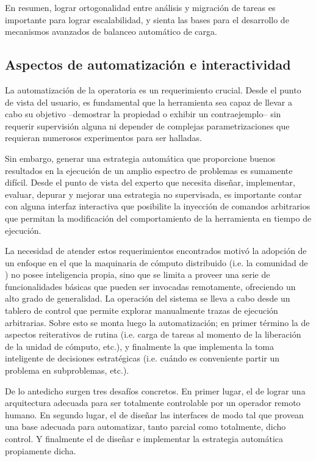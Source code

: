 En resumen, lograr ortogonalidad entre análisis y migración de tareas es
importante para lograr escalabilidad, y sienta las bases para el desarrollo de mecanismos
avanzados de balanceo automático de carga.



\subsection{Aspectos de automatización e interactividad}

La automatización de la operatoria es un requerimiento crucial. Desde el punto
de vista del usuario, es fundamental que la herramienta sea capaz de llevar a
cabo su objetivo --demostrar la propiedad o exhibir un contraejemplo-- sin requerir
supervisión alguna ni depender de complejas parametrizaciones que requieran
numerosos experimentos para ser halladas.

Sin embargo, generar una estrategia automática que proporcione buenos resultados
en la ejecución de un amplio espectro de problemas es sumamente difícil. Desde el
punto de vista del experto que necesita diseñar, implementar, evaluar, depurar y
mejorar una estrategia no supervisada, es importante contar con alguna
interfaz interactiva que posibilite la inyección de comandos arbitrarios que permitan 
la modificación del comportamiento de la herramienta en tiempo de ejecución.

La necesidad de atender estos requerimientos encontrados motivó la adopción de
un enfoque en el que la maquinaria de cómputo distribuido (i.e. la comunidad de \ws) no posee inteligencia
propia, sino que se limita a proveer una serie de funcionalidades básicas que
pueden ser invocadas remotamente, ofreciendo un alto grado de generalidad. La
operación del sistema se lleva a cabo desde un tablero de control que permite
explorar manualmente trazas de ejecución arbitrarias. Sobre esto se monta
luego la automatización; en primer término la de aspectos reiterativos de rutina (i.e. carga de tareas al momento de la liberación de la unidad de cómputo, etc.),
y finalmente la que implementa la toma inteligente de decisiones estratégicas (i.e. cuándo es conveniente partir un problema en subproblemas, etc.).

De lo antedicho surgen tres desafíos concretos. En primer lugar, el de lograr una
arquitectura adecuada para ser totalmente controlable por un operador remoto humano.
En segundo lugar, el de diseñar las interfaces de modo tal que provean una base adecuada
para automatizar, tanto parcial como totalmente, dicho control. Y finalmente el de
diseñar e implementar la estrategia automática propiamente dicha.


